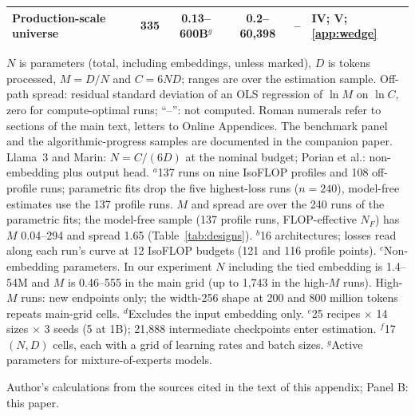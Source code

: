 \begin{table}[tp]
\begin{tabular*}{\textwidth}{@{\extracolsep{\fill}}lrcccl@{}}
Production-scale universe & 335 & 0.13--600B$^{g}$ & 0.2--60,398 & -- & IV; V; \ref{app:wedge} \\
\bottomrule
\end{tabular*}
\vspace{3pt}
\begin{tablenotes}
$N$ is parameters (total, including embeddings, unless marked), $D$ is tokens processed, $M=D/N$ and $C=6ND$; ranges
are over the estimation sample. Off-path spread: residual standard deviation of an OLS regression of $\ln M$ on $\ln C$,
zero for compute-optimal runs; ``--'': not computed. Roman numerals refer to sections of the main text, letters to
Online Appendices. The benchmark panel and the algorithmic-progress samples are documented in the companion paper. Llama~3 and Marin: $N=C/(6D)$ at the nominal budget; Porian et al.: non-embedding plus output head.
$^{a}$137 runs on nine IsoFLOP profiles and 108 off-profile runs; parametric fits drop the five highest-loss runs
($n=240$), model-free estimates use the 137 profile runs. $M$ and spread are over the 240 runs of the parametric fits; the
model-free sample (137 profile runs, FLOP-effective $N_F$) has $M$ 0.04--294 and spread 1.65 (Table~\ref{tab:designs}).
$^{b}$16 architectures; losses read along each run's curve at 12 IsoFLOP budgets (121 and 116 profile points).
$^{c}$Non-embedding parameters. In our experiment $N$ including the tied embedding is 1.4--54M and $M$ is 0.46--555 in
the main grid (up to 1,743 in the high-$M$ runs). High-$M$ runs: new endpoints only; the width-256 shape at 200 and 800
million tokens repeats main-grid cells.
$^{d}$Excludes the input embedding only.
$^{e}$25 recipes $\times$ 14 sizes $\times$ 3 seeds (5 at 1B); 21,888 intermediate checkpoints enter estimation.
$^{f}$17 $(N,D)$ cells, each with a grid of learning rates and batch sizes.
$^{g}$Active parameters for mixture-of-experts models.
\end{tablenotes}
\begin{tablenotes}[Source]
Author's calculations from the sources cited in the text of this appendix; Panel B: this paper.
\end{tablenotes}
\end{table}
